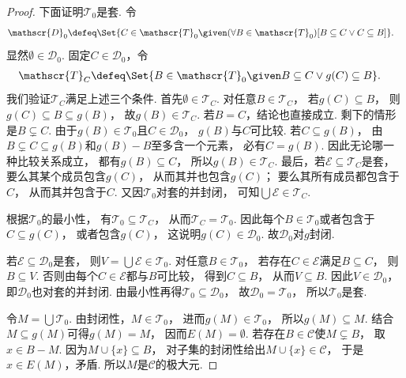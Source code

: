 \begin{lemma}
\begin{proof}
        下面证明\(\mathscr{T}_0\)是套.
        令
        \begin{align*}
            \mathscr{D}_0&\defeq\Set{C\in\mathscr{T}_0\given
            (\forall B\in\mathscr{T}_0)[B\subseteq C\lor C\subseteq B]}.
        \end{align*}
        显然\(\emptyset\in\mathscr{D}_0\).
        固定\(C\in\mathscr{D}_0\)，令
        \begin{align*}
            \mathscr{T}_C&\defeq\Set{B\in\mathscr{T}_0\given
            B\subseteq C\lor g(C)\subseteq B}.
        \end{align*}
        我们验证\(\mathscr{T}_C\)满足上述三个条件.
        首先\(\emptyset\in\mathscr{T}_C\).
        对任意\(B\in\mathscr{T}_C\)，
        若\(g(C)\subseteq B\)，
        则\(g(C)\subseteq B\subseteq g(B)\)，
        故\(g(B)\in\mathscr{T}_C\).
        若\(B=C\)，结论也直接成立.
        剩下的情形是\(B\subsetneq C\).
        由于\(g(B)\in\mathscr{T}_0\)且\(C\in\mathscr{D}_0\)，
        \(g(B)\)与\(C\)可比较.
        若\(C\subseteq g(B)\)，
        由\(B\subsetneq C\subseteq g(B)\)和\(g(B)-B\)至多含一个元素，
        必有\(C=g(B)\).
        因此无论哪一种比较关系成立，
        都有\(g(B)\subseteq C\)，
        所以\(g(B)\in\mathscr{T}_C\).
        最后，若\(\mathscr{E}\subseteq\mathscr{T}_C\)是套，
        要么其某个成员包含\(g(C)\)，
        从而其并也包含\(g(C)\)；
        要么其所有成员都包含于\(C\)，
        从而其并包含于\(C\).
        又因\(\mathscr{T}_0\)对套的并封闭，
        可知\(\bigcup\mathscr{E}\in\mathscr{T}_C\).

        根据\(\mathscr{T}_0\)的最小性，
        有\(\mathscr{T}_0\subseteq\mathscr{T}_C\)，
        从而\(\mathscr{T}_C=\mathscr{T}_0\).
        因此每个\(B\in\mathscr{T}_0\)或者包含于\(C\subseteq g(C)\)，
        或者包含\(g(C)\)，
        这说明\(g(C)\in\mathscr{D}_0\).
        故\(\mathscr{D}_0\)对\(g\)封闭.

        若\(\mathscr{E}\subseteq\mathscr{D}_0\)是套，
        则\(V=\bigcup\mathscr{E}\in\mathscr{T}_0\).
        对任意\(B\in\mathscr{T}_0\)，
        若存在\(C\in\mathscr{E}\)满足\(B\subseteq C\)，
        则\(B\subseteq V\).
        否则由每个\(C\in\mathscr{E}\)都与\(B\)可比较，
        得到\(C\subseteq B\)，
        从而\(V\subseteq B\).
        因此\(V\in\mathscr{D}_0\)，
        即\(\mathscr{D}_0\)也对套的并封闭.
        由最小性再得\(\mathscr{T}_0\subseteq\mathscr{D}_0\)，
        故\(\mathscr{D}_0=\mathscr{T}_0\)，
        所以\(\mathscr{T}_0\)是套.

        令\(M=\bigcup\mathscr{T}_0\).
        由封闭性，\(M\in\mathscr{T}_0\)，
        进而\(g(M)\in\mathscr{T}_0\)，
        所以\(g(M)\subseteq M\).
        结合\(M\subseteq g(M)\)可得\(g(M)=M\)，
        因而\(E(M)=\emptyset\).
        若存在\(B\in\mathscr{C}\)使\(M\subsetneq B\)，
        取\(x\in B-M\).
        因为\(M\cup\{x\}\subseteq B\)，
        对子集的封闭性给出\(M\cup\{x\}\in\mathscr{C}\)，
        于是\(x\in E(M)\)，矛盾.
        所以\(M\)是\(\mathscr{C}\)的极大元.
    \end{proof}
\end{lemma}

